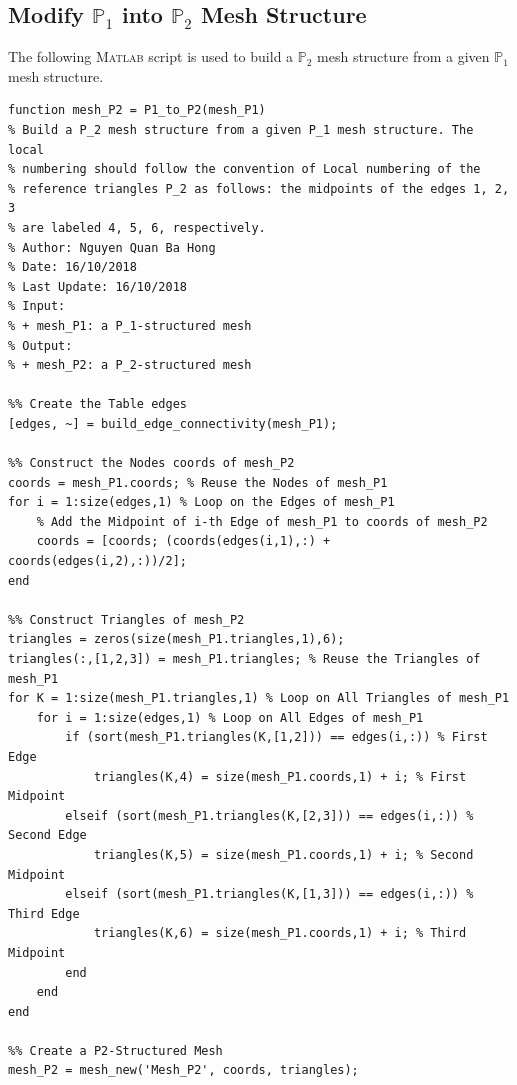 \documentclass[11pt,a4paper,center,notitlepage]{article}
\numberwithin{equation}{section}
\begin{document}
\subsection{Modify $\mathbb{P}_1$ into $\mathbb{P}_2$ Mesh Structure}\label{sec5.3}
The following \textsc{Matlab} script is used to build a $\mathbb{P}_2$ mesh structure from a given $\mathbb{P}_1$ mesh structure. 
\begin{verbatim}
function mesh_P2 = P1_to_P2(mesh_P1)
% Build a P_2 mesh structure from a given P_1 mesh structure. The local
% numbering should follow the convention of Local numbering of the
% reference triangles P_2 as follows: the midpoints of the edges 1, 2, 3
% are labeled 4, 5, 6, respectively.
% Author: Nguyen Quan Ba Hong
% Date: 16/10/2018
% Last Update: 16/10/2018
% Input:
% + mesh_P1: a P_1-structured mesh
% Output:
% + mesh_P2: a P_2-structured mesh

%% Create the Table edges
[edges, ~] = build_edge_connectivity(mesh_P1);

%% Construct the Nodes coords of mesh_P2
coords = mesh_P1.coords; % Reuse the Nodes of mesh_P1
for i = 1:size(edges,1) % Loop on the Edges of mesh_P1
    % Add the Midpoint of i-th Edge of mesh_P1 to coords of mesh_P2
    coords = [coords; (coords(edges(i,1),:) + coords(edges(i,2),:))/2];
end

%% Construct Triangles of mesh_P2
triangles = zeros(size(mesh_P1.triangles,1),6);
triangles(:,[1,2,3]) = mesh_P1.triangles; % Reuse the Triangles of mesh_P1
for K = 1:size(mesh_P1.triangles,1) % Loop on All Triangles of mesh_P1
    for i = 1:size(edges,1) % Loop on All Edges of mesh_P1
        if (sort(mesh_P1.triangles(K,[1,2])) == edges(i,:)) % First Edge
            triangles(K,4) = size(mesh_P1.coords,1) + i; % First Midpoint
        elseif (sort(mesh_P1.triangles(K,[2,3])) == edges(i,:)) % Second Edge
            triangles(K,5) = size(mesh_P1.coords,1) + i; % Second Midpoint
        elseif (sort(mesh_P1.triangles(K,[1,3])) == edges(i,:)) % Third Edge
            triangles(K,6) = size(mesh_P1.coords,1) + i; % Third Midpoint
        end
    end
end

%% Create a P2-Structured Mesh
mesh_P2 = mesh_new('Mesh_P2', coords, triangles);
\end{verbatim}
\end{document}
